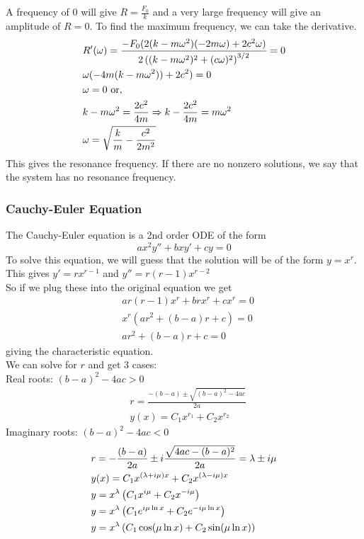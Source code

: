 \documentclass[11pt, fleqn]{article}
\begin{document}
A frequency of $0$ will give $R=\frac{F_0}{k}$ and a very large frequency will give an amplitude of $R=0$. To find the maximum frequency, we can take the derivative.
\begin{align*}
    &R'(\omega)=\frac{-F_0(2(k-m\omega^2)(-2m\omega)+2c^2\omega)}{2\left( (k-m\omega^2)^2+(c\omega)^2 \right)^{3/2}}=0\\
    &\omega(-4m(k-m\omega^2))+2c^2)=0\\
    &\omega=0\text{ or,}\\
    &k-m\omega^2=\frac{2c^2}{4m}\Rightarrow k-\frac{2c^2}{4m}=m\omega^2\\
    &\omega=\sqrt{\frac{k}{m}-\frac{c^2}{2m^2}}
\end{align*}
This gives the resonance frequency. If there are no nonzero solutions, we say that the system has no resonance frequency.
\subsubsection{Cauchy-Euler Equation}
The Cauchy-Euler equation is a 2nd order ODE of the form
$$ax^2y''+bxy'+cy=0$$
To solve this equation, we will guess that the solution will be of the form $y=x^r$.\\
This gives $y'=rx^{r-1}$ and $y''=r(r-1)x^{r-2}$\\
So if we plug these into the original equation we get
\begin{align*}
    &ar(r-1)x^r+brx^r+cx^r=0\\
    &x^r(ar^2+(b-a)r+c)=0\\
    &ar^2+(b-a)r+c=0
\end{align*}
giving the characteristic equation.\\
We can solve for $r$ and get 3 cases:\\
Real roots: $(b-a)^2-4ac>0$
\begin{align*}
    &r=\frac{-(b-a)\pm\sqrt{(b-a)^2-4ac}}{2a}\\
    &y(x)=C_1x^{r_1}+C_2x^{r_2}
\end{align*}
Imaginary roots: $(b-a)^2-4ac<0$\\
\begin{align*}
    &r=-\frac{(b-a)}{2a}\pm i\frac{\sqrt{4ac-(b-a)^2}}{2a}=\lambda\pm i\mu\\
    &y(x)=C_1x^{(\lambda+i\mu)x}+C_2x^{(\lambda-i\mu)x}\\
    &y=x^\lambda\left( C_1x^{i\mu}+C_2x^{-i\mu} \right)\\
    &y=x^\lambda\left( C_1e^{i\mu\ln x}+C_2e^{-i\mu\ln x} \right)\\
    &y=x^\lambda\left( C_1\cos(\mu\ln x)+C_2\sin(\mu\ln x) \right)
\end{align*}
\end{document}
